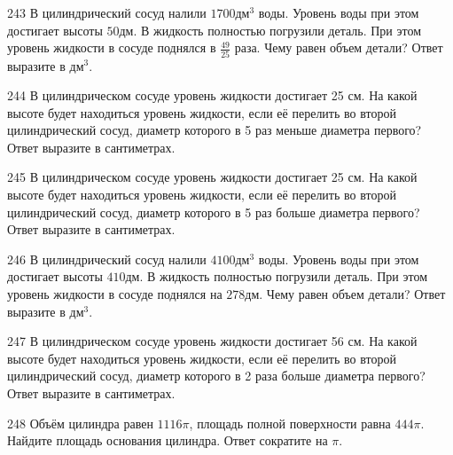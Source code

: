 \documentclass[4apaper]{article}
\begin{document}
\begin{taskBN}{243}
В цилиндрический сосуд налили $1700\mbox{дм}^3$ воды. Уровень воды при этом достигает высоты $50$дм. В жидкость полностью погрузили деталь. При этом уровень жидкости в сосуде поднялся в $\frac{49}{25}$ раза. Чему равен объем детали? Ответ выразите в $\mbox{дм}^3$.
\end{taskBN}

\begin{taskBN}{244}
В цилиндрическом сосуде уровень жидкости достигает 25 см. На какой высоте будет находиться уровень жидкости, если её перелить во второй цилиндрический сосуд, диаметр которого в 5 раз меньше диаметра первого? Ответ выразите в сантиметрах.
\end{taskBN}

\begin{taskBN}{245}
В цилиндрическом сосуде уровень жидкости достигает 25 см. На какой высоте будет находиться уровень жидкости, если её перелить во второй цилиндрический сосуд, диаметр которого в 5 раз больше диаметра первого? Ответ выразите в сантиметрах.
\end{taskBN}

\begin{taskBN}{246}
В цилиндрический сосуд налили $4100\mbox{дм}^3$ воды. Уровень воды при этом достигает высоты $410$дм. В жидкость полностью погрузили деталь. При этом уровень жидкости в сосуде поднялся на $278$дм. Чему равен объем детали? Ответ выразите в $\mbox{дм}^3$.
\end{taskBN}

\begin{taskBN}{247}
В цилиндрическом сосуде уровень жидкости достигает 56 см. На какой высоте будет находиться уровень жидкости, если её перелить во второй цилиндрический сосуд, диаметр которого в 2 раза больше диаметра первого? Ответ выразите в сантиметрах.
\end{taskBN}

\begin{taskBN}{248}
Объём цилиндра равен $1116\pi$, площадь полной поверхности равна $444\pi$. Найдите площадь основания цилиндра. Ответ сократите на $\pi$.
\end{taskBN}
\end{document}
